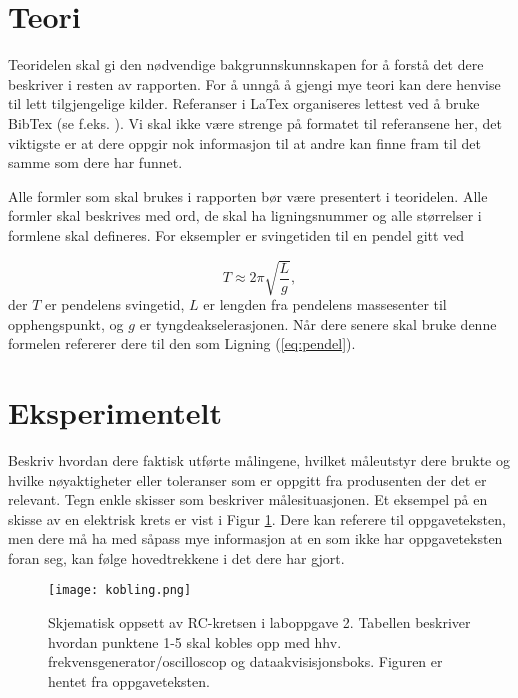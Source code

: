 \documentclass[norsk,a4paper,12pt]{article}
\begin{document}
\section{Teori}
Teoridelen skal gi den nødvendige bakgrunnskunnskapen for å forstå det dere beskriver i resten av rapporten. For å unngå å gjengi mye teori kan dere henvise til lett tilgjengelige kilder. Referanser i LaTex organiseres lettest ved å bruke BibTex (se f.eks. \cite{BibTex}). Vi skal ikke være strenge på formatet til referansene her, det viktigste er at dere oppgir nok informasjon til at andre kan finne fram til det samme som dere har funnet.

Alle formler som skal brukes i rapporten bør være presentert i teoridelen. Alle formler skal beskrives med ord, de skal ha ligningsnummer og alle størrelser i formlene skal defineres. For eksempler er svingetiden til en pendel gitt ved

\begin{equation}
T \approx 2\pi\sqrt{\frac{L}{g}},
\label{eq:pendel}
\end{equation}
der $T$ er pendelens svingetid, $L$ er lengden fra pendelens massesenter til opphengspunkt, og $g$ er tyngdeakselerasjonen. Når dere senere skal bruke denne formelen refererer dere til den som Ligning (\ref{eq:pendel}).


\section{Eksperimentelt}
Beskriv hvordan dere faktisk utførte målingene, hvilket måleutstyr
dere brukte og hvilke nøyaktigheter eller toleranser som er oppgitt
fra produsenten der det er relevant. Tegn enkle skisser som beskriver målesituasjonen. Et eksempel på en skisse av en elektrisk krets er vist i Figur \ref{fig:krets}. Dere kan referere til oppgaveteksten, men dere må ha med såpass mye informasjon at en som ikke har oppgaveteksten foran seg, kan følge hovedtrekkene i det dere har gjort.

\begin{figure}
\begin{center}
  \texttt{[image: kobling.png]}\\
  \caption{Skjematisk oppsett av RC-kretsen i laboppgave 2. Tabellen beskriver hvordan punktene 1-5 skal kobles opp med hhv. frekvensgenerator/oscilloscop og dataakvisisjonsboks. Figuren er hentet fra oppgaveteksten. }\label{fig:krets}
  \end{center}
\end{figure}
\end{document}
